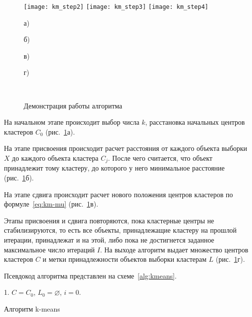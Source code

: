 \begin{figure}[h!]
    \centering
     \hspace{1ex}
    \texttt{[image: km\_step2]} \hspace{1ex}
    \texttt{[image: km\_step3]} \hspace{1ex}
    \texttt{[image: km\_step4]} \\
    \parbox{.2\textwidth}{\centering\small а)} \hspace{1ex}
    \parbox{.2\textwidth}{\centering\small б)} \hspace{1ex}
    \parbox{.2\textwidth}{\centering\small в)} \hspace{1ex}
    \parbox{.2\textwidth}{\centering\small г)} \\[1ex]
    \parbox{.9\textwidth}{\caption{Демонстрация работы алгоритма}\label{pic:km_steps}}
\end{figure}

На начальном этапе происходит выбор числа \( k \), расстановка начальных центров кластеров \( C_0 \) (рис.~\ref{pic:km_steps}а).

На этапе присвоения происходит расчет расстояния от каждого объекта выборки \( X \) до каждого объекта кластера \( C_j \). После чего считается, что объект принадлежит тому кластеру, до которого у него минимальное расстояние (рис.~\ref{pic:km_steps}б).

На этапе сдвига происходит расчет нового положения центров кластеров по формуле~\eqref{eq:km-mu} (рис.~\ref{pic:km_steps}в).

Этапы присвоения и сдвига повторяются, пока кластерные центры не стабилизируются, то есть все объекты, принадлежащие кластеру на прошлой итерации, принадлежат и на этой, либо пока не достигнется заданное максимальное число итераций \( I \). На выходе алгоритм выдает множество центров кластеров \( C \) и метки принадлежности объектов выборки кластерам \( L \) (рис.~\ref{pic:km_steps}г).

Псевдокод алгоритма представлен на схеме~\ref{alg:kmeans}.
\begin{algorithm}
    1. \( C = C_0 \), \( L_0 = \varnothing \), \( i = 0\). 
    \caption{Алгоритм k-means}
    \label{alg:kmeans}
\end{algorithm}

